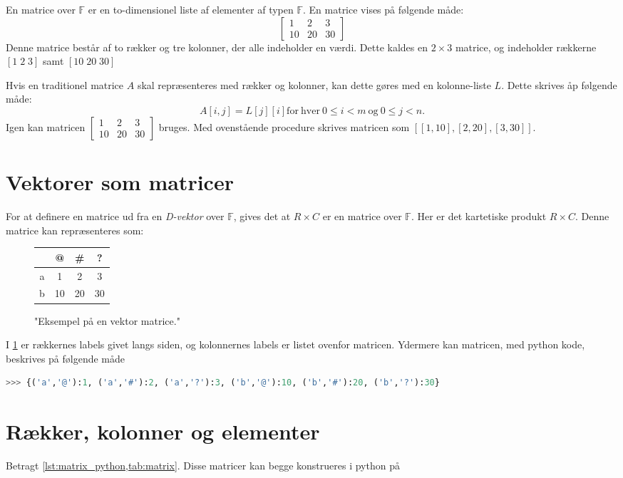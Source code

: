 En matrice over $\mathbb{F}$ er en to-dimensionel liste af elementer af typen $\mathbb{F}$.
En matrice vises på følgende måde:
$$\left[
\begin{matrix}
    1&2&3\\
    10&20&30
\end{matrix}
\right]
$$
Denne matrice består af to rækker og tre kolonner, der alle indeholder en værdi.
Dette kaldes en $2 \times 3$ matrice, og indeholder rækkerne $[1\;2\;3]$ samt $[10\;20\;30]$

Hvis en traditionel matrice $A$ skal repræsenteres med rækker og kolonner, kan dette gøres med en kolonne-liste $L$.
Dette skrives åp følgende måde:
\begin{equation}
    A\left[i,j\right] = L\left[j\right]\left[i\right]\mathrm{for\ hver\ }0\leq i<m\mathrm{\ og\ }0\leq j<n.
\end{equation}
Igen kan matricen $\left[\begin{matrix}1&2&3\\10&20&30\end{matrix}\right]$ bruges.
Med ovenstående procedure skrives matricen som $[[1,10],[2,20],[3,30]]$.

\section{Vektorer som matricer}
For at definere en matrice ud fra en \textit{D-vektor} over $\mathbb{F}$, gives det at $R\times C$ er en matrice over $\mathbb{F}$.
Her er det kartetiske produkt $R\times C$.
Denne matrice kan repræsenteres som:
\begin{figure}[h!]
    \centering
    \begin{tabular}{c|ccc}
        & @ & \# & ?\\\hline
        a&1&2&3\\
        b&10&20&30
    \end{tabular}
    \label{tab:matrix}
    \caption{"Eksempel på en vektor matrice."}
\end{figure}

I \cref{tab:matrix} er rækkernes labels givet langs siden, og kolonnernes labels er listet ovenfor matricen.
Ydermere kan matricen, med python kode, beskrives på følgende måde
\begin{lstlisting}[language=Python,label=lst:matrix_python]
    >>> {('a','@'):1, ('a','#'):2, ('a','?'):3, ('b','@'):10, ('b','#'):20, ('b','?'):30}
\end{lstlisting} 

\section{Rækker, kolonner og elementer}
Betragt \cref{lst:matrix_python,tab:matrix}.
Disse matricer kan begge konstrueres i python på 

